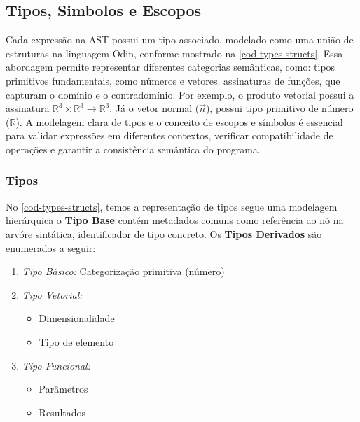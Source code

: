 \subsection{Tipos, Simbolos e Escopos} \label{subsection-symbols-scopes}

Cada expressão na AST possui um tipo associado, modelado como uma união de estruturas na linguagem Odin, conforme mostrado na \autoref{cod-types-structs}. Essa abordagem permite representar diferentes categorias semânticas, como: tipos primitivos fundamentais, como números e vetores. assinaturas de funções, que capturam o domínio e o contradomínio. Por exemplo, o produto vetorial possui a assinatura $\mathbb{R}^3 \times \mathbb{R}^3 \to \mathbb{R}^3$. Já o vetor normal ($\vec{n}$), possui tipo primitivo de número ($\mathbb{R}$). A modelagem clara de tipos e o conceito de escopos e símbolos é essencial para validar expressões em diferentes contextos, verificar compatibilidade de operações e garantir a consistência semântica do programa.


\subsubsection{Tipos}
No \autoref{cod-types-structs}, temos a representação de tipos segue uma modelagem hierárquica o \textbf{Tipo Base} contém metadados comuns
como referência ao nó na arvóre sintática, identificador de tipo concreto. Os \textbf{Tipos Derivados} são enumerados a seguir:

\begin{enumerate}
    \item \textit{Tipo Básico:} Categorização primitiva (número)
    \item \textit{Tipo Vetorial:}
    \begin{itemize}
        \item Dimensionalidade
        \item Tipo de elemento
    \end{itemize}
    \item \textit{Tipo Funcional:}
    \begin{itemize}
        \item Parâmetros
        \item Resultados
    \end{itemize}
\end{enumerate}

